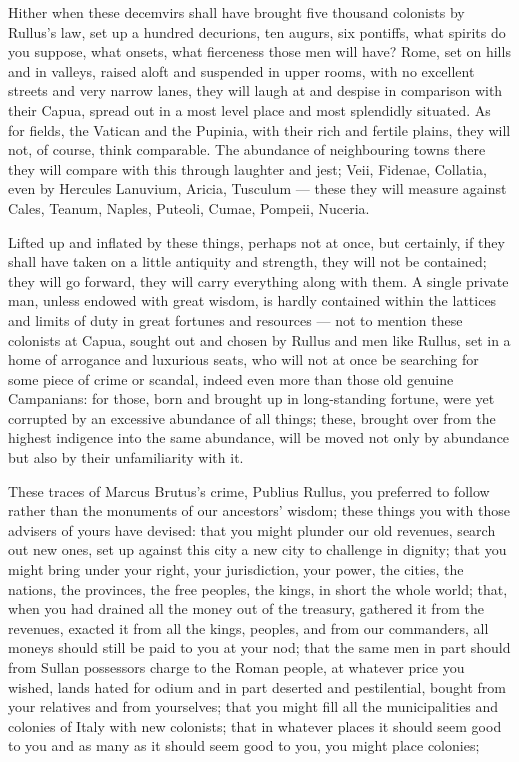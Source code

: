  Hither when these decemvirs shall have brought five thousand colonists by Rullus's law, set up a hundred decurions, ten augurs, six pontiffs, what spirits do you suppose, what onsets, what fierceness those men will have? Rome, set on hills and in valleys, raised aloft and suspended in upper rooms, with no excellent streets and very narrow lanes, they will laugh at and despise in comparison with their Capua, spread out in a most level place and most splendidly situated. As for fields, the Vatican and the Pupinia, with their rich and fertile plains, they will not, of course, think comparable. The abundance of neighbouring towns there they will compare with this through laughter and jest; Veii, Fidenae, Collatia, even by Hercules Lanuvium, Aricia, Tusculum --- these they will measure against Cales, Teanum, Naples, Puteoli, Cumae, Pompeii, Nuceria.

 Lifted up and inflated by these things, perhaps not at once, but certainly, if they shall have taken on a little antiquity and strength, they will not be contained; they will go forward, they will carry everything along with them. A single private man, unless endowed with great wisdom, is hardly contained within the lattices and limits of duty in great fortunes and resources --- not to mention these colonists at Capua, sought out and chosen by Rullus and men like Rullus, set in a home of arrogance and luxurious seats, who will not at once be searching for some piece of crime or scandal, indeed even more than those old genuine Campanians: for those, born and brought up in long-standing fortune, were yet corrupted by an excessive abundance of all things; these, brought over from the highest indigence into the same abundance, will be moved not only by abundance but also by their unfamiliarity with it.

 These traces of Marcus Brutus's crime, Publius Rullus, you preferred to follow rather than the monuments of our ancestors' wisdom; these things you with those advisers of yours have devised: that you might plunder our old revenues, search out new ones, set up against this city a new city to challenge in dignity; that you might bring under your right, your jurisdiction, your power, the cities, the nations, the provinces, the free peoples, the kings, in short the whole world; that, when you had drained all the money out of the treasury, gathered it from the revenues, exacted it from all the kings, peoples, and from our commanders, all moneys should still be paid to you at your nod; that the same men in part should from Sullan possessors charge to the Roman people, at whatever price you wished, lands hated for odium and in part deserted and pestilential, bought from your relatives and from yourselves; that you might fill all the municipalities and colonies of Italy with new colonists; that in whatever places it should seem good to you and as many as it should seem good to you, you might place colonies;

